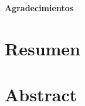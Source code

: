 
\begin{center}
{\large \bf Agradecimientos}
\end{center}


\newpage
\chapter*{\centering \large Resumen}

\newpage
\chapter*{\centering \large Abstract}
